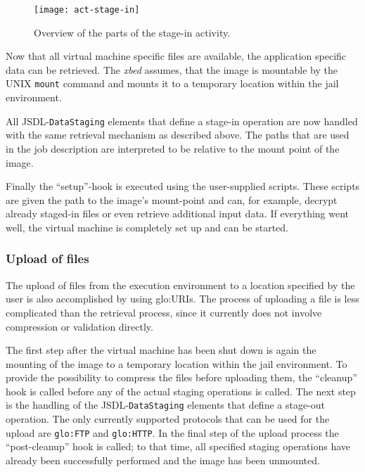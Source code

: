 \begin{figure}[ht]
  \centering
  \texttt{[image: act-stage-in]}
  \caption[Stage-In  Activity]{Overview  of  the  parts  of  the  stage-in
    activity.}
  \label{fig:act-stage-in}
\end{figure}

Now that all virtual machine specific files are available, the application
specific data can be retrieved. The \emph{xbed} assumes, that the image is
mountable by the UNIX \texttt{mount}  command and mounts it to a temporary
location within the jail environment.

All  JSDL-\texttt{DataStaging} elements that  define a  stage-in operation
are now handled with the  same retrieval mechanism as described above. The
paths that are used in the  job description are interpreted to be relative
to the mount point of the image.

Finally   the   ``setup''-hook  is   executed   using  the   user-supplied
scripts. These scripts  are given the path to  the image's mount-point and
can,  for  example,  decrypt  already  staged-in files  or  even  retrieve
additional input  data. If  everything went well,  the virtual  machine is
completely set up and can be started.

\subsubsection{Upload of files}

The upload of files from the execution environment to a location specified
by the user  is also accomplished by using  \gls{glo:URI}s. The process of
uploading a file is less  complicated than the retrieval process, since it
currently does  not involve compression or validation  directly.

The first step  after the virtual machine has been shut  down is again the
mounting of the image to a temporary location within the jail environment.
To provide  the possibility to  compress the files before  uploading them,
the ``cleanup'' hook is called before any of the actual staging operations
is called. The next step  is the handling of the JSDL-\texttt{DataStaging}
elements that  define a stage-out operation. The  only currently supported
protocols that can  be used for the upload  are \texttt{\gls{glo:FTP}} and
\texttt{\gls{glo:HTTP}}.  In the  final  step of  the  upload process  the
``post-cleanup''  hook is  called;  to that  time,  all specified  staging
operations have already been successfully performed and the image has been
unmounted.

